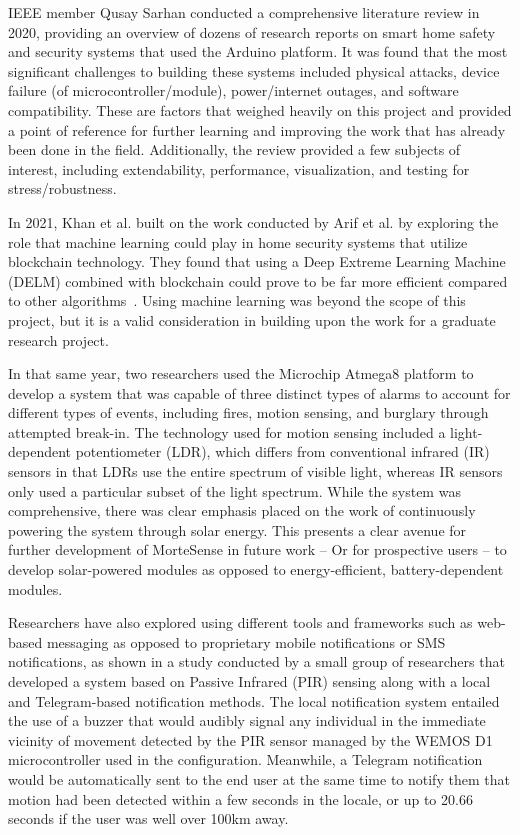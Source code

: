 IEEE member Qusay Sarhan conducted a comprehensive literature review in 2020, providing an
overview of dozens of research reports on smart home safety and security systems that
used the Arduino platform. It was found that the most significant challenges to building
these systems included physical attacks, device failure (of microcontroller/module),
power/internet outages, and software compatibility. These are factors that
weighed heavily on this project and provided a point of reference for further learning
and improving the work that has already been done in the field.
Additionally, the review provided a few subjects of interest, including extendability,
performance, visualization, and testing for stress/robustness. \cite{sarhan2020}

In 2021, Khan et al. built on the work conducted by Arif et al. by exploring the role that
machine learning could play in home security systems that utilize blockchain technology. They
found that using a Deep Extreme Learning Machine (DELM) combined with blockchain could prove
to be far more efficient compared to other algorithms~\cite{khanEtAl2021}. Using machine
learning was beyond the scope of this project, but it is a valid consideration in building
upon the work for a graduate research project.

In that same year, two researchers used the Microchip Atmega8 platform to develop a system
that was capable of three distinct types of alarms to account for different types of events,
including fires, motion sensing, and burglary through attempted break-in. The technology used
for motion sensing included a light-dependent potentiometer (LDR), which differs from
conventional infrared (IR) sensors in that LDRs use the entire spectrum of visible light,
whereas IR sensors only used a particular subset of the light spectrum. While the system was
comprehensive, there was clear emphasis placed on the work of continuously powering the
system through solar energy.\cite{chowdhuryAhmed2021} This presents a clear avenue for
further development of MorteSense in future work -- Or for prospective users -- to develop
solar-powered modules as opposed to energy-efficient, battery-dependent modules.

Researchers have also explored using different tools and frameworks such as web-based
messaging as opposed to proprietary mobile notifications or SMS notifications, as shown in a
study conducted by a small group of researchers that developed a system based on Passive
Infrared (PIR) sensing along with a local and Telegram-based notification methods. The local
notification system entailed the use of a buzzer that would audibly signal any individual in
the immediate vicinity of movement detected by the PIR sensor managed by the WEMOS D1
microcontroller used in the configuration. Meanwhile, a Telegram notification would be
automatically sent to the end user at the same time to notify them that motion had been
detected within a few seconds in the locale, or up to 20.66 seconds if the user was well over
100km away. \cite{WahyuniEtAl2021}

